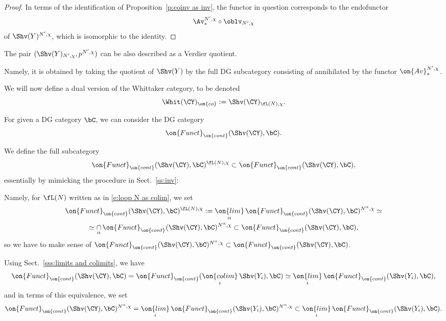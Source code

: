 \documentclass[9pt]{amsart}
\theoremstyle{definition}
\theoremstyle{remark}
\newcommand{\secref}[1]{Sect.~\ref{#1}}
\newcommand{\propref}[1]{Proposition~\ref{#1}}
\numberwithin{equation}{section}
\begin{document}
\begin{proof}
In terms of the identification of \propref{p:coinv as inv}, the functor in question corresponds to the endofunctor
$$\Av^{N',\chi}_*\circ \oblv_{N',\chi}$$
of $\Shv(Y)^{N',\chi}$, which is isomorphic to the identity.
\end{proof} 

\sssec{}  \label{sss:coinv as quot}

The pair $(\Shv(Y)_{N',\chi},p^{N',\chi})$ can be also described as a Verdier quotient. 

\medskip

Namely, it is obtained by taking the quotient 
of $\Shv(Y)$ by the full DG subcategory consisting of annihilated by the functor $\on{Av}^{N',\chi}_*$. 


We will now define a dual version of the Whittaker category, to be denoted 
$$\Whit(\CY)_{\on{co}}:=\Shv(\CY)_{\fL(N),\chi}.$$

\sssec{}

For given a DG category $\bC$, we can consider the DG category
$$\on{Funct}_{\on{cont}}(\Shv(\CY),\bC).$$

We define the full subcategory
$$\on{Funct}_{\on{cont}}(\Shv(\CY),\bC)^{\fL(N),\chi}\subset \on{Funct}_{\on{cont}}(\Shv(\CY),\bC),$$
essentially by mimicking the procedure in \secref{ss:inv}: 

\medskip

Namely, for $\fL(N)$ written as in \eqref{e:loop N as colim}, we set
\begin{multline*}
\on{Funct}_{\on{cont}}(\Shv(\CY),\bC)^{\fL(N),\chi}:=
\underset{\alpha}{\on{lim}}\, \on{Funct}_{\on{cont}}(\Shv(\CY),\bC)^{N^\alpha,\chi}\simeq \\
\simeq \underset{\alpha}\cap\, \on{Funct}_{\on{cont}}(\Shv(\CY),\bC)^{N^\alpha,\chi}\subset \on{Funct}_{\on{cont}}(\Shv(\CY),\bC),
\end{multline*}
so we have to make sense of $\on{Funct}_{\on{cont}}(\Shv(\CY),\bC)^{N^\alpha,\chi}\subset \on{Funct}_{\on{cont}}(\Shv(\CY),\bC)$.

\medskip

Using \secref{sss:limits and colimits}, we have
$$\on{Funct}_{\on{cont}}(\Shv(\CY),\bC)=\on{Funct}_{\on{cont}}(\underset{i}{\on{colim}}\, \Shv(Y_i),\bC)\simeq
\underset{i}{\on{lim}}\, \on{Funct}_{\on{cont}}(\Shv(Y_i),\bC),$$
and in terms of this equivalence, we set
$$\on{Funct}_{\on{cont}}(\Shv(\CY),\bC)^{N^\alpha,\chi}=\underset{i}{\on{lim}}\, 
\on{Funct}_{\on{cont}}(\Shv(Y_i),\bC)^{N^\alpha,\chi}
\subset \underset{i}{\on{lim}}\, \on{Funct}_{\on{cont}}(\Shv(Y_i),\bC).$$
\end{document}
